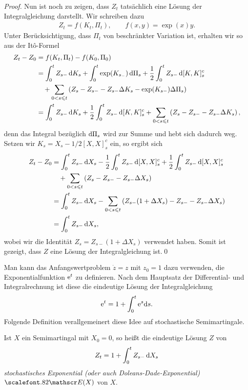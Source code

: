 \begin{proof}
Nun ist noch zu zeigen, dass $Z_t$ tatsächlich eine Lösung der Integralgleichung
darstellt. Wir schreiben dazu
\begin{align*}
Z_t = f(K_t,\Pi_t),\qquad f(x,y) = \exp(x)y.  
\end{align*}
Unter Berücksichtigung, dass $\Pi_t$ von beschränkter Variation ist, erhalten 
wir so aus der Itô-Formel
\begin{align*}
Z_t - Z_0 &= f(K_t,\Pi_t)-f(K_0,\Pi_0)\\
&= 
\int_0^t Z_{s-} \,\mathrm{d} K_s
+
\int_0^t \exp(K_{s_-}) \,\mathrm{d} \Pi_s +
\frac{1}{2}\int_0^t Z_{s-}\,\mathrm{d}[K,K]_s^c\\
&\quad
+
\sum_{0 < s\leqslant t} \left(Z_{s}-Z_{s-} - Z_{s-}\Delta K_s - \exp(K_{s-})\Delta
\Pi_s\right)\\
&=
\int_0^t Z_{s-} \,\mathrm{d} K_s
+
\frac{1}{2}\int_0^t Z_{s-}\,\mathrm{d}[K,K]_s^c
+
\sum_{0 < s\leqslant t} \left(Z_{s}-Z_{s-} - Z_{s-}\Delta K_s\right),
\end{align*}
denn das Integral bezüglich $\mathrm{d}\Pi_s$ wird zur Summe und hebt sich dadurch
weg. Setzen wir $K_s = X_s - 1/2[X,X]_s^c$ ein, so ergibt sich
\begin{align*}
Z_t - Z_0 &= 
\int_0^t Z_{s-} \,\mathrm{d} X_s
-\frac{1}{2}
\int_0^t Z_{s-} \,\mathrm{d} [X,X]^c_s
+
\frac{1}{2}\int_0^t Z_{s-}\,\mathrm{d}[X,X]_s^c\\
&\quad +
\sum_{0 < s\leqslant t} \left(Z_{s}-Z_{s-} - Z_{s-}\Delta X_s\right)\\
&= 
\int_0^t Z_{s-} \,\mathrm{d} X_s
-
\sum_{0 < s\leqslant t} \left(Z_{s-}(1+\Delta X_s)-Z_{s-} - Z_{s-}\Delta X_s\right)\\
&= \int_0^t Z_{s-} \,\mathrm{d} X_s, 
\end{align*}
wobei wir die Identität $Z_s = Z_{s-}(1+\Delta X_s)$ verwendet haben. Somit ist
gezeigt, dass $Z$ eine Lösung der Integralgleichung ist.\qed
\end{proof}

Man kann das Anfangswertproblem $\dot z = z$ mit $z_0 = 1$ dazu
verwenden, die Exponentialfunktion $\mathrm{e}^t$ zu definieren. Nach dem Hauptsatz der
Differential- und Integralrechnung ist diese die eindeutige Lösung der
Integralgleichung
\begin{align*}
\mathrm{e}^t = 1 + \int_0^t \mathrm{e}^s \mathrm{d} s.
\end{align*}
Folgende Definition verallgemeinert diese Idee auf stochastische Semimartingale.

\begin{definition}
Ist $X$ ein Semimartingal mit $X_0=0$, so heißt die eindeutige Lösung $Z$ von
\begin{align*}
Z_t = 1+ \int_0^t Z_{s-} \,\mathrm{d} X_s
\end{align*}
\emph{stochastisches Exponential (oder auch Doleans-Dade-Exponential)}
$\pcal{E}(X)$ von $X$.\fish
\end{definition}

